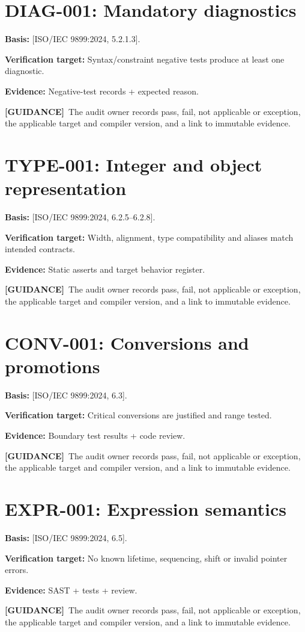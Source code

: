 \documentclass[10pt,letterpaper,oneside]{report}
\newcommand{\refcl}[1]{\textsf{\footnotesize[ISO/IEC 9899:2024, #1]}}
\newcommand{\guidance}{\textbf{[GUIDANCE]}}
\begin{document}
\section{DIAG-001: Mandatory diagnostics}
\textbf{Basis:} \refcl{5.2.1.3}.\par\textbf{Verification target:} Syntax/constraint negative tests produce at least one diagnostic.\par\textbf{Evidence:} Negative-test records + expected reason.\par\guidance\ The audit owner records pass, fail, not applicable or exception, the applicable target and compiler version, and a link to immutable evidence.
\section{TYPE-001: Integer and object representation}
\textbf{Basis:} \refcl{6.2.5--6.2.8}.\par\textbf{Verification target:} Width, alignment, type compatibility and aliases match intended contracts.\par\textbf{Evidence:} Static asserts and target behavior register.\par\guidance\ The audit owner records pass, fail, not applicable or exception, the applicable target and compiler version, and a link to immutable evidence.
\section{CONV-001: Conversions and promotions}
\textbf{Basis:} \refcl{6.3}.\par\textbf{Verification target:} Critical conversions are justified and range tested.\par\textbf{Evidence:} Boundary test results + code review.\par\guidance\ The audit owner records pass, fail, not applicable or exception, the applicable target and compiler version, and a link to immutable evidence.
\section{EXPR-001: Expression semantics}
\textbf{Basis:} \refcl{6.5}.\par\textbf{Verification target:} No known lifetime, sequencing, shift or invalid pointer errors.\par\textbf{Evidence:} SAST + tests + review.\par\guidance\ The audit owner records pass, fail, not applicable or exception, the applicable target and compiler version, and a link to immutable evidence.
\end{document}
